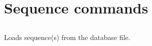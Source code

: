 
\section{Sequence commands}


\subsection[seq\_load]{  }



Loads sequence(s) from the database file.


